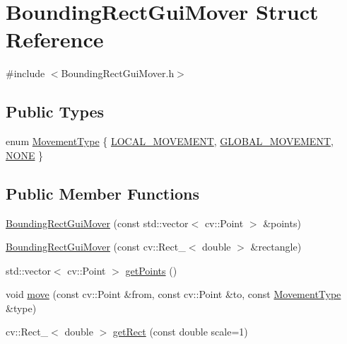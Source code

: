 \hypertarget{struct_bounding_rect_gui_mover}{}\section{Bounding\+Rect\+Gui\+Mover Struct Reference}
\label{struct_bounding_rect_gui_mover}


{\ttfamily \#include $<$Bounding\+Rect\+Gui\+Mover.\+h$>$}

\subsection*{Public Types}
\begin{DoxyCompactItemize}
\item 
enum \hyperlink{struct_bounding_rect_gui_mover_a76ac02999d4012d5a8ba60853d2c6493}{Movement\+Type} \{ \hyperlink{struct_bounding_rect_gui_mover_a76ac02999d4012d5a8ba60853d2c6493abf66fc6c222bd5db76829f8b8a227202}{L\+O\+C\+A\+L\+\_\+\+M\+O\+V\+E\+M\+E\+NT}, 
\hyperlink{struct_bounding_rect_gui_mover_a76ac02999d4012d5a8ba60853d2c6493a1703ea806817f5f686511ed4c49f6eb7}{G\+L\+O\+B\+A\+L\+\_\+\+M\+O\+V\+E\+M\+E\+NT}, 
\hyperlink{struct_bounding_rect_gui_mover_a76ac02999d4012d5a8ba60853d2c6493a3965bc68b15cffd59d6d4cf842e0578c}{N\+O\+NE}
 \}
\end{DoxyCompactItemize}
\subsection*{Public Member Functions}
\begin{DoxyCompactItemize}
\item 
\hyperlink{struct_bounding_rect_gui_mover_ab11a7dba1cae9cb635258daae2b161eb}{Bounding\+Rect\+Gui\+Mover} (const std\+::vector$<$ cv\+::\+Point $>$ \&points)
\item 
\hyperlink{struct_bounding_rect_gui_mover_aee1d69e1b9d599b692e1226f3455974f}{Bounding\+Rect\+Gui\+Mover} (const cv\+::\+Rect\+\_\+$<$ double $>$ \&rectangle)
\item 
std\+::vector$<$ cv\+::\+Point $>$ \hyperlink{struct_bounding_rect_gui_mover_a72ff4270c2c100aab98125ca381aab10}{get\+Points} ()
\item 
void \hyperlink{struct_bounding_rect_gui_mover_a86c01942e7a57a0cec7d757592b40c41}{move} (const cv\+::\+Point \&from, const cv\+::\+Point \&to, const \hyperlink{struct_bounding_rect_gui_mover_a76ac02999d4012d5a8ba60853d2c6493}{Movement\+Type} \&type)
\item 
cv\+::\+Rect\+\_\+$<$ double $>$ \hyperlink{struct_bounding_rect_gui_mover_a5e242d1bbc84714da0fa04b0adee0e5d}{get\+Rect} (const double scale=1)
\end{DoxyCompactItemize}


